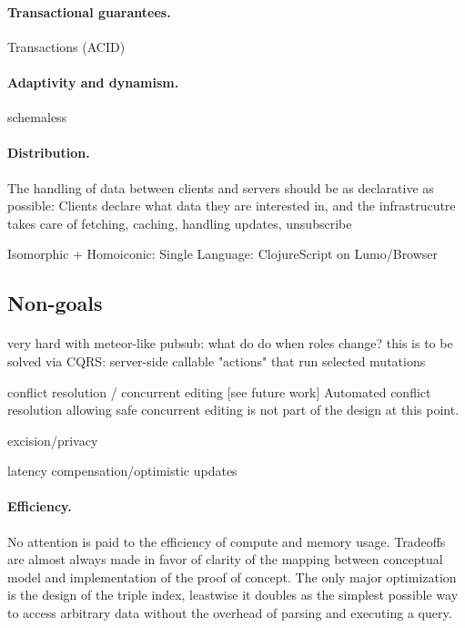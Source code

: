 \paragraph{Transactional guarantees.}
Transactions (ACID)


\paragraph{Adaptivity and dynamism.}
schemaless


\paragraph{Distribution.}
The handling of data between clients and servers should be as declarative as possible: Clients declare what data they are interested in, and the infrastrucutre takes care of fetching, caching, handling updates, unsubscribe

Isomorphic + Homoiconic: Single Language: ClojureScript on Lumo/Browser




\subsection{Non-goals}\label{sec:nongoals}


\paragraph{}
very hard with meteor-like pubsub: what do do when roles change?
this is to be solved via \gls{CQRS}: server-side callable "actions" that run selected mutations

conflict resolution / concurrent editing [see future work]
Automated conflict resolution allowing safe concurrent editing is not part of the design at this point.

excision/privacy

latency compensation/optimistic updates

\paragraph{Efficiency.}
No attention is paid to the efficiency of compute and memory usage. Tradeoffs are almost always made in favor of clarity of the mapping between conceptual model and implementation of the proof of concept. The only major optimization is the design of the triple index, leastwise it doubles as the simplest possible way to access arbitrary data without the overhead of parsing and executing a query.

